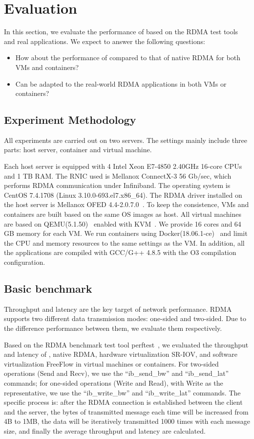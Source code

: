 \section{Evaluation} \label{eval}
In this section, we evaluate the performance of \sys based on the RDMA test tools and real applications. We expect to answer the following questions:

\begin{itemize}
\item How about the performance of \sys compared to that of native RDMA for both VMs and containers?
\item Can \sys be adapted to the real-world RDMA applications in both VMs or containers?
\end{itemize}

\subsection{Experiment Methodology}
All experiments are carried out on two servers. The settings mainly include three parts: host server, container and virtual machine. 

Each host server is equipped with 4 Intel Xeon E7-4850 2.40GHz 16-core CPUs and 1 TB RAM. The RNIC used is Mellanox ConnectX-3 56 Gb/sec, which performs RDMA communication under Infiniband.  The operating system is CentOS 7.4.1708 (Linux 3.10.0-693.el7.x86\_64). The RDMA driver installed on the host server is Mellanox OFED 4.4-2.0.7.0~\cite{mlnx-ofed}. To keep the consistence, VMs and containers are built based on the same OS images as host. All virtual machines are based on QEMU(5.1.50)~\cite{qemu} enabled with KVM~\cite{kvm}. We provide 16 cores and 64 GB memory for each VM. We run containers using Docker(18.06.1-ce)~\cite{docker} and limit the CPU and memory resources to the same settings as the VM. In addition, all the applications are compiled with GCC/G++ 4.8.5 with the O3 compilation configuration. 


\subsection{Basic benchmark}
Throughput and latency are the key target of network performance. RDMA supports two different data transmission modes: one-sided and two-sided. Due to the difference performance between them, we evaluate them respectively.

Based on the RDMA benchmark test tool perftest~\cite{perftest}, we evaluated the throughput and latency of \sys, native RDMA, hardware virtualization SR-IOV, and software virtualization FreeFlow in virtual machines or containers. For two-sided operations (Send and Recv), we use the ``ib\_send\_bw'' and ``ib\_send\_lat'' commands; for one-sided operations (Write and Read), with Write as the representative, we use the ``ib\_write\_bw'' and ``ib\_write\_lat'' commands. The specific process is: after the RDMA connection is established between the client and the server, the bytes of transmitted message each time will be increased from 4B to 1MB, the data will be iteratively transmitted 1000 times with each message size, and finally the average throughput and latency are calculated.

